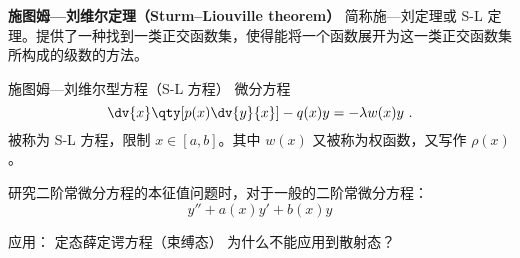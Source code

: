 
\begin{issues}
\issueDraft
\end{issues}





\textbf{施图姆—刘维尔定理（Sturm–Liouville theorem）} 简称施—刘定理或 S-L 定理。提供了一种找到一类正交函数集，使得能将一个函数展开为这一类正交函数集所构成的级数的方法。

\begin{definition}{施图姆—刘维尔型方程（S-L 方程）}
微分方程
\begin{equation}
\dv{x}\qty[p(x)\dv{y}{x}] - q(x) y = -\lambda w(x) y~.
\end{equation}
被称为 S-L 方程，限制 $x \in [a, b]$。其中 $w(x)$ 又被称为权函数，又写作 $\rho(x)$。
\end{definition}


研究二阶常微分方程的本征值问题时，对于一般的二阶常微分方程：
$$y'' + a(x) y' +b(x) y$$
 
应用： 定态薛定谔方程（束缚态） 为什么不能应用到散射态？
